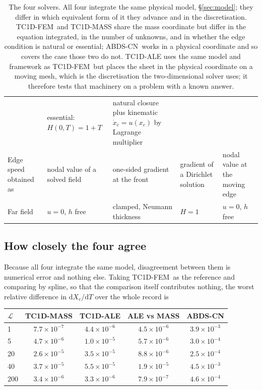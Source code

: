 \documentclass[11pt,a4paper]{article}
\newcommand{\TC}{\textsf{TC1D-FEM}}
\newcommand{\AB}{\textsf{ABDS-CN}}
\newcommand{\Xc}{X_{c}}
\begin{document}
\begin{table}[htbp]
\begin{tabular}{@{}p{}p{}p{}p{}p{}@{}}
    & essential: $H(0,T) = 1+T$
    & natural closure plus kinematic $\dot{x}_c = u(x_c)$ by Lagrange multiplier \\[2pt]
  Edge speed obtained as
    & nodal value of a solved field
    & one-sided gradient at the front
    & gradient of a Dirichlet solution
    & nodal value at the moving edge \\[2pt]
  Far field
    & $u = 0$, $h$ free
    & clamped, Neumann thickness
    & $H = 1$
    & $u = 0$, $h$ free \\
  \bottomrule
  \end{tabular}
  \caption{The four solvers. All four integrate the same physical model,
  \S\ref{sec:model}; they differ in which equivalent form of it they advance and
  in the discretisation.
  \TC\ and \textsf{TC1D-MASS} share the mass coordinate but differ in the
  equation integrated, in the number of unknowns, and in whether the edge
  condition is natural or essential; \AB\ works in a physical coordinate and so covers the
  case those two do not. \textsf{TC1D-ALE} uses the same model and framework
  as \TC\ but places the sheet in the physical coordinate on a moving mesh,
  which is the discretisation the two-dimensional solver uses; it therefore
  tests that machinery on a problem with a known answer.}
  \label{tab:solvers}
\end{table}

\subsection{How closely the four agree}
\label{sec:agreement}

Because all four integrate the same model, disagreement between them is
numerical error and nothing else. Taking \TC\ as the reference and comparing by
spline, so that the comparison itself contributes nothing, the worst relative
difference in $\mathrm{d}\Xc/\mathrm{d}T$ over the whole record is

\begin{center}
\small
\begin{tabular}{@{}lcccc@{}}
\toprule
$\mathcal{L}$ & \textsf{TC1D-MASS} & \textsf{TC1D-ALE} & ALE vs MASS & \AB \\
\midrule
1   & $7.7\times10^{-7}$ & $4.4\times10^{-6}$ & $4.5\times10^{-6}$ & $3.9\times10^{-3}$ \\
5   & $4.7\times10^{-6}$ & $1.0\times10^{-5}$ & $5.7\times10^{-6}$ & $3.0\times10^{-4}$ \\
20  & $2.6\times10^{-5}$ & $3.5\times10^{-5}$ & $8.8\times10^{-6}$ & $2.5\times10^{-4}$ \\
40  & $3.7\times10^{-5}$ & $5.5\times10^{-5}$ & $1.9\times10^{-5}$ & $4.5\times10^{-3}$ \\
200 & $3.4\times10^{-6}$ & $3.3\times10^{-6}$ & $7.9\times10^{-7}$ & $4.6\times10^{-4}$ \\
\bottomrule
\end{tabular}
\end{center}
\end{document}
